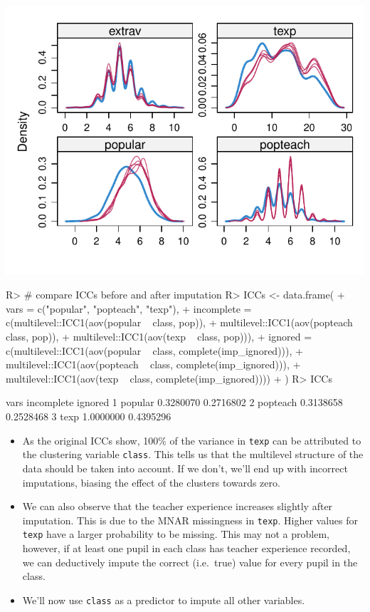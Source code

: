 \documentclass[
]{jss}
\begin{document}
\begin{CodeChunk}
\begin{center}\includegraphics{Manuscript_files/figure-latex/pop-ignored-3} \end{center}

\begin{CodeInput}
R> # compare ICCs before and after imputation
R> ICCs <- data.frame(
+   vars = c("popular", "popteach", "texp"), 
+   incomplete = c(multilevel::ICC1(aov(popular ~ class, pop)), 
+                multilevel::ICC1(aov(popteach ~ class, pop)),
+                multilevel::ICC1(aov(texp ~ class, pop))), 
+   ignored = c(multilevel::ICC1(aov(popular ~ class, complete(imp_ignored))), 
+               multilevel::ICC1(aov(popteach ~ class, complete(imp_ignored))), 
+               multilevel::ICC1(aov(texp ~ class, complete(imp_ignored))))
+   )
R> ICCs
\end{CodeInput}
\begin{CodeOutput}
      vars incomplete   ignored
1  popular  0.3280070 0.2716802
2 popteach  0.3138658 0.2528468
3     texp  1.0000000 0.4395296
\end{CodeOutput}
\end{CodeChunk}

\begin{itemize}
\item
  As the original ICCs show, 100\% of the variance in \texttt{texp} can
  be attributed to the clustering variable \texttt{class}. This tells us
  that the multilevel structure of the data should be taken into
  account. If we don't, we'll end up with incorrect imputations, biasing
  the effect of the clusters towards zero.
\item
  We can also observe that the teacher experience increases slightly
  after imputation. This is due to the MNAR missingness in
  \texttt{texp}. Higher values for \texttt{texp} have a larger
  probability to be missing. This may not a problem, however, if at
  least one pupil in each class has teacher experience recorded, we can
  deductively impute the correct (i.e.~true) value for every pupil in
  the class.
\item
  We'll now use \texttt{class} as a predictor to impute all other
  variables.
\end{itemize}
\end{document}
